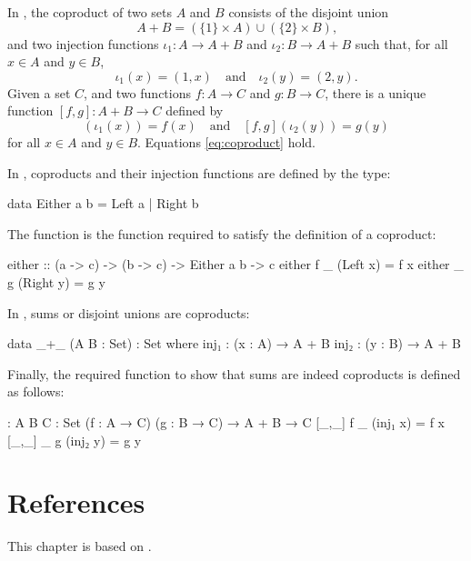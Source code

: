 \begin{example}
  \label{ex:coproduct-set}


  In \set, the coproduct of two sets $A$ and $B$ consists of the
  disjoint union
  \begin{equation}
    A + B = (\{1\} \times A) \cup (\{2\} \times B)
    \text{,}
  \end{equation}
  and two injection functions $\iota_{1}: A \to A + B$ and $\iota_{2}:
  B \to A + B$ such that, for all $x \in A$ and $y \in B$,
  \begin{equation}
    \iota_{1}(x) = (1,x)
    \quad
    \text{and}
    \quad
    \iota_{2}(y) = (2,y)
    \text{.}
  \end{equation}
  Given a set $C$, and two functions $f: A \to C$ and $g: B \to C$,
  there is a unique function $[f,g]: A + B \to C$ defined by
  \begin{equation}
    [f,g](\iota_{1}(x)) = f(x)
    \quad
    \text{and}
    \quad
    [f,g](\iota_{2}(y)) = g(y)
  \end{equation}
  for all $x \in A$ and $y \in B$. Equations \eqref{eq:coproduct}
  hold.

\end{example}

\begin{example}
  \label{ex:coproduct-haskell}

  In \hask, coproducts and their injection functions are defined by
  the  type:
  \begin{codehaskell}
data Either a b = Left a | Right b
  \end{codehaskell}
  The  function is the function required to
  satisfy the definition of a coproduct:
  \begin{codehaskell}
either :: (a -> c) -> (b -> c) -> Either a b -> c
either f _ (Left x)  = f x
either _ g (Right y) = g y
  \end{codehaskell}

\end{example}

\begin{example}
  \label{ex:coproduct-agda}

  In \agda, sums or disjoint unions are coproducts:
  \begin{codeagda}
data _+_ (A B : Set) : Set where
  inj₁ : (x : A) → A + B
  inj₂ : (y : B) → A + B
  \end{codeagda}
  Finally, the required function to show that sums are indeed
  coproducts is defined as follows:
  \begin{codeagda}
[_,_] : {A B C : Set} (f : A → C) (g : B → C) → A + B → C
[_,_] f _ (inj₁ x) = f x
[_,_] _ g (inj₂ y) = g y
  \end{codeagda}

\end{example}

\section{References}
\label{sec:constructions-references}

This chapter is based on \parencites[15--19]{pierce-1991}[439--440,
  444]{poigne-1992}[63]{maclane-1998}.

\clearemptydoublepage
